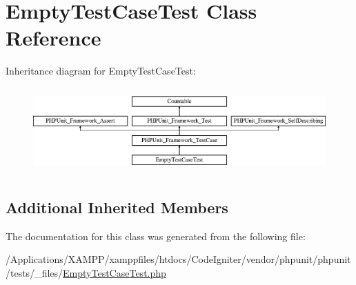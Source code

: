 \hypertarget{class_empty_test_case_test}{}\section{Empty\+Test\+Case\+Test Class Reference}
\label{class_empty_test_case_test}
Inheritance diagram for Empty\+Test\+Case\+Test\+:\begin{figure}[H]
\begin{center}
\leavevmode
\includegraphics[height=3.303835cm]{class_empty_test_case_test}
\end{center}
\end{figure}
\subsection*{Additional Inherited Members}


The documentation for this class was generated from the following file\+:\begin{DoxyCompactItemize}
\item 
/\+Applications/\+X\+A\+M\+P\+P/xamppfiles/htdocs/\+Code\+Igniter/vendor/phpunit/phpunit/tests/\+\_\+files/\mbox{\hyperlink{_empty_test_case_test_8php}{Empty\+Test\+Case\+Test.\+php}}\end{DoxyCompactItemize}
